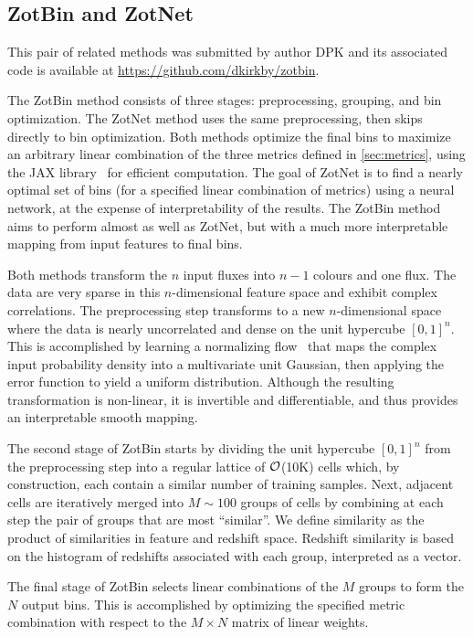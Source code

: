 \documentclass[twocolumn,twocolappendix]{aastex63}
\begin{document}
\subsection{ {\sc ZotBin and ZotNet} }

This pair of related methods was submitted by author DPK and its associated code is available at
\url{https://github.com/dkirkby/zotbin}.

The ZotBin method consists of three stages: preprocessing, grouping, and bin optimization.  The ZotNet method
uses the same preprocessing, then skips directly to bin optimization.  Both methods optimize the final bins to
maximize an arbitrary linear combination of the three metrics defined in \ref{sec:metrics}, using the JAX
library~\cite{jax} for efficient computation. The goal of ZotNet is to find a nearly optimal set of bins (for
a specified linear combination of metrics) using a neural network, at the expense of interpretability of the
results.  The ZotBin method aims to perform almost as well as ZotNet, but with a much more interpretable mapping
from input features to final bins.

Both methods transform the $n$ input fluxes into $n-1$ colours and one flux. The data are very sparse in this
$n$-dimensional feature space and exhibit complex correlations. The preprocessing step transforms to a new
$n$-dimensional space where the data is nearly uncorrelated and dense on the unit hypercube $[0,1]^n$. This is accomplished
by learning a normalizing flow~\cite{2019arXiv191202762P} that maps the complex input probability density
into a multivariate unit Gaussian, then applying the error function to yield a uniform distribution. Although
the resulting transformation is non-linear, it is invertible and differentiable, and thus provides an interpretable
smooth mapping.

The second stage of ZotBin starts by dividing the unit hypercube $[0,1]^n$ from the preprocessing step
into a regular lattice of ${\cal O}$(10K) cells which, by construction, each contain a similar number
of training samples.  Next, adjacent cells are iteratively merged into $M \sim 100$ groups of cells by
combining at each step the pair of groups that are most ``similar''.  We define similarity as the product
of similarities in feature and redshift space.  Redshift similarity is based on the histogram of redshifts
associated with each group, interpreted as a vector.

The final stage of ZotBin selects linear combinations of the $M$ groups to form the $N$ output bins. This is
accomplished by optimizing the specified metric combination with respect to the $M\times N$ matrix of linear
weights.
\end{document}
